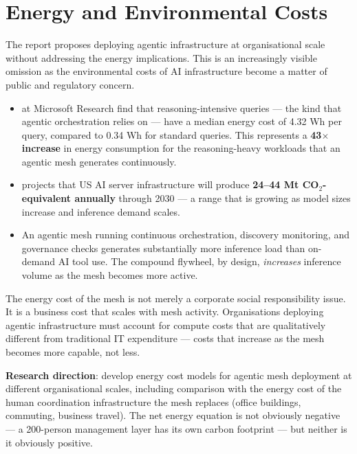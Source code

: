 \section{Energy and Environmental Costs}

The report proposes deploying agentic infrastructure at organisational scale without addressing the energy implications. This is an increasingly visible omission as the environmental costs of AI infrastructure become a matter of public and regulatory concern.

\begin{evidencebox}[title={The Energy Cost of Agentic Systems}]
\begin{itemize}
  \item \textcite{Patterson2025} at Microsoft Research find that reasoning-intensive queries --- the kind that agentic orchestration relies on --- have a median energy cost of 4.32 Wh per query, compared to 0.34 Wh for standard queries. This represents a \textbf{43$\times$ increase} in energy consumption for the reasoning-heavy workloads that an agentic mesh generates continuously.
  \item \textcite{NatureSustainability2025} projects that US AI server infrastructure will produce \textbf{24--44 Mt CO$_2$-equivalent annually} through 2030 --- a range that is growing as model sizes increase and inference demand scales.
  \item An agentic mesh running continuous orchestration, discovery monitoring, and governance checks generates substantially more inference load than on-demand AI tool use. The compound flywheel, by design, \emph{increases} inference volume as the mesh becomes more active.
\end{itemize}
\end{evidencebox}

The energy cost of the mesh is not merely a corporate social responsibility issue. It is a business cost that scales with mesh activity. Organisations deploying agentic infrastructure must account for compute costs that are qualitatively different from traditional IT expenditure --- costs that increase as the mesh becomes more capable, not less.

\textbf{Research direction}: develop energy cost models for agentic mesh deployment at different organisational scales, including comparison with the energy cost of the human coordination infrastructure the mesh replaces (office buildings, commuting, business travel). The net energy equation is not obviously negative --- a 200-person management layer has its own carbon footprint --- but neither is it obviously positive.

